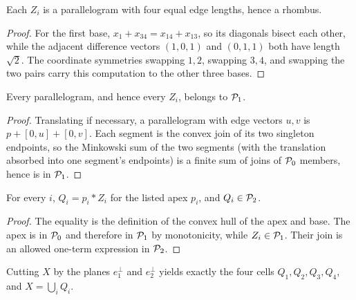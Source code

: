 \begin{lemma}
  \label{lem:rhombic-bases}
  Each $Z_i$ is a parallelogram with four equal edge lengths, hence a rhombus.
\end{lemma}
\begin{proof}
  For the first base,
  $x_1+x_{34}=x_{14}+x_{13}$, so its diagonals bisect each other, while the
  adjacent difference vectors $(1,0,1)$ and $(0,1,1)$ both have length
  $\sqrt2$.  The coordinate symmetries swapping $1,2$, swapping $3,4$, and
  swapping the two pairs carry this computation to the other three bases.
\end{proof}

\begin{lemma}
  \label{lem:rhombus-class-one}
  Every parallelogram, and hence every $Z_i$, belongs to $\mathcal{P}_1$.
\end{lemma}
\begin{proof}
  Translating if necessary, a parallelogram with edge vectors $u,v$ is
  $p+[0,u]+[0,v]$.  Each segment is the convex join of its two singleton
  endpoints, so the Minkowski sum of the two segments (with the translation
  absorbed into one segment's endpoints) is a finite sum of joins of
  $\mathcal{P}_0$ members, hence is in $\mathcal{P}_1$.
\end{proof}

\begin{lemma}
  \label{lem:rhombic-cells-class-two}
  For every $i$, $Q_i=p_i*Z_i$ for the listed apex $p_i$, and
  $Q_i\in\mathcal{P}_2$.
\end{lemma}
\begin{proof}
  The equality is the definition of the convex hull of the apex and base.
  The apex is in $\mathcal{P}_0$ and therefore in $\mathcal{P}_1$ by monotonicity, while
  $Z_i\in\mathcal{P}_1$.  Their join is an allowed one-term expression in
  $\mathcal{P}_2$.
\end{proof}

\begin{lemma}
  \label{lem:tetrahedron-cell-cover}
  \notready
  Cutting $X$ by the planes $e_1^\perp$ and $e_2^\perp$ yields exactly the
  four cells $Q_1,Q_2,Q_3,Q_4$, and $X=\bigcup_iQ_i$.
\end{lemma}

